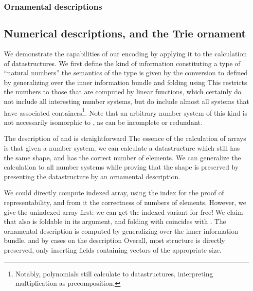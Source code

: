 \subsubsection{Ornamental descriptions}




\subsection{Numerical descriptions, and the Trie ornament}\label{ssec:trieo}
We demonstrate the capabilities of our encoding by applying it to the calculation of datastructures. We first define the kind of information constituting a type of ``natural numbers''
the semantics of the type is given by the conversion to \bN
defined by generalizing over the inner information bundle and folding using
This restricts the numbers to those that are computed by linear functions, which certainly do not include all interesting number systems, but do include almost all systems that have associated containers\footnote{Notably, polynomials still calculate to datastructures, interpreting multiplication as precomposition.}. Note that an arbitrary number system of this kind is not necessarily isomorphic to \bN, as can be incomplete or redundant.

The description of \bN and \bL is straightforward
The essence of the calculation of arrays is that given a number system, we can calculate a datastructure which still has the same shape, and has the correct number of elements. We can generalize the calculation to all number systems while proving that the shape is preserved by presenting the datastructure by an ornamental description.

We could directly compute indexed array, using the index for the proof of representability, and from it the correctness of numbers of elements. However, we give the unindexed array first: we can get the indexed variant for free\cite{algorn}! We claim that 
also is foldable in its argument, and folding with  coincides with . The ornamental description is computed by generalizing over the inner information bundle, and by cases on the description
Overall, most structure is directly preserved, only inserting fields containing vectors of the appropriate size.

